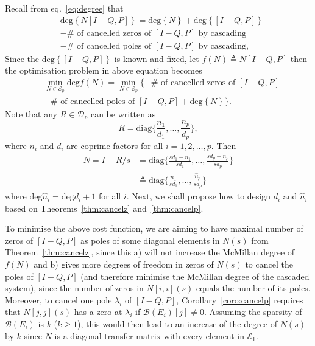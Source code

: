 \documentclass[twocolumn,12pt]{autart}
\theoremstyle{plain}
\begin{document}
Recall from eq.~\eqref{eq:degree} that 
\begin{align*}
&\text{deg}\left\{N[I-Q,P]\right\}=\text{deg}\left\{N\right\}+\text{deg}\left\{[I-Q,P]\right\}\nonumber\\
&-\text{$\#$ of cancelled zeros of $[I-Q,P]$ by cascading}\nonumber\\
 &- \text{$\#$ of cancelled poles of $[I-Q,P]$ by cascading}, 
\end{align*}
Since the $\text{deg}\left\{[I-Q,P]\right\}$ is known and fixed, let $f(N)\triangleq N[I-Q,P]$ then the optimisation problem in above equation becomes
\begin{align*} 
&\min_{N\in\mathcal{E}_p}\text{deg}f(N)=
\min_{N\in\mathcal{E}_p}\{-\text{$\#$ of cancelled zeros of $[I-Q,P]$}\nonumber\\
&- \text{$\#$ of cancelled poles of $[I-Q,P]$}+\text{deg}\left\{N\right\}\}.
\end{align*}
Note that any $R\in\mathcal{D}_p$ can be written as 
\begin{equation}
R=\text{diag}\{\frac{n_1}{d_1},\ldots,\frac{n_p}{d_p}\}, 
\end{equation}
where $n_i$ and $d_i$ are coprime factors for all $i=1,2,\ldots,p$. Then 
\begin{align}
N=I-R/s&=\text{diag}\{\frac{sd_1-n_1}{sd_1},\ldots,\frac{sd_p-n_p}{sd_p}\} \label{eq:Nnew1}\\
&\triangleq\text{diag}\{\frac{\hat{n}_1}{sd_1},\ldots,\frac{\hat{n}_p}{sd_p}\} \label{eq:Nnew2}
\end{align}
where $\text{deg}\hat{n}_i=\text{deg}d_i+1$ for all $i$. Next, we shall propose how to design $d_i$ and $\hat{n}_i$ based on Theorems~\ref{thm:cancelz} and~\ref{thm:cancelp}.

To minimise the above cost function, we are aiming to have maximal number of zeros of $[I-Q,P]$ as poles of some diagonal elements in $N(s)$ from Theorem~\ref{thm:cancelz}, since this a) will not increase the McMillan degree of $f(N)$ and b) gives more degrees of freedom in zeros of $N(s)$ to cancel the poles of $[I-Q,P]$ (and therefore minimise the McMillan degree of the cascaded system), since the number of zeros in $N[i,i](s)$ equals the number of its poles. Moreover, to cancel one pole $\lambda_i$ of $[I-Q,P]$, Corollary~\ref{coro:cancelp} requires that $N[j,j](s)$ has a zero at $\lambda_i$ if $\mathcal{B}(E_i)[j]\neq0$. Assuming the sparsity of $\mathcal{B}(E_i)$ is $k$ ($k\ge1$), this would then lead to an increase of the degree of $N(s)$ by $k$ since $N$ is a diagonal transfer matrix with every element in $\mathcal{E}_1$.
\end{document}
